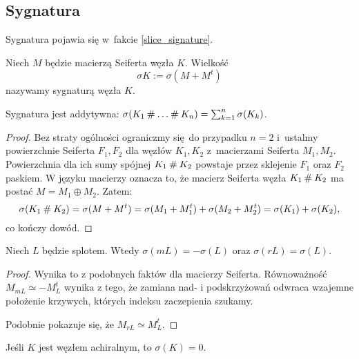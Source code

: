 \subsection{Sygnatura} %
\label{sub:signature}
Sygnatura pojawia się w~fakcie \ref{slice_signature}.

\begin{definition}
    Niech $M$ będzie macierzą Seiferta węzła $K$.
    Wielkość
    \begin{equation}
        \sigma K := \sigma(M + M^t)
    \end{equation}
    nazywamy sygnaturą węzła $K$.
\end{definition}

\begin{proposition} \label{prop_sigma_additive}
    Sygnatura jest addytywna: $\sigma(K_1 \mathbin{\#} \ldots \mathbin{\#} K_n) = \sum_{k=1}^n \sigma(K_k)$.
\end{proposition}

\begin{proof}
    Bez straty ogólności ograniczmy się do przypadku $n = 2$ i~ustalmy powierzchnie Seiferta $F_1, F_2$ dla węzłów $K_1, K_2$ z~macierzami Seiferta $M_1, M_2$.
    Powierzchnia dla ich sumy spójnej $K_1 \mathbin{\#} K_2$ powstaje przez sklejenie $F_1$ oraz $F_2$ paskiem.
    W języku macierzy oznacza to, że macierz Seiferta węzła $K_1 \mathbin{\#} K_2$ ma postać $M = M_1 \oplus M_2$.
    Zatem:
    \begin{equation}
        \sigma(K_1 \mathbin{\#} K_2) = \sigma(M + M^t) = \sigma(M_1 + M_1^t) + \sigma(M_2 + M_2^t) = \sigma(K_1) + \sigma(K_2),
    \end{equation}
    co kończy dowód.
\end{proof}

\begin{proposition} \label{prop_sigma_inverse}
    Niech $L$ będzie splotem.
    Wtedy $\sigma(mL) = -\sigma(L)$ oraz $\sigma(rL) = \sigma(L)$.
\end{proposition}

\begin{proof}
    Wynika to z podobnych faktów dla macierzy Seiferta.
    Równoważność $M_{mL} \simeq - M_L^t$ wynika z tego, że zamiana nad- i podskrzyżowań odwraca wzajemne położenie krzywych, których indeksu zaczepienia szukamy.

    Podobnie pokazuje się, że $M_{rL} \simeq M_L^t$.
\end{proof}

\begin{corollary}
    \label{crl:acheiral_signature}
    Jeśli $K$ jest węzłem achiralnym, to $\sigma(K) = 0$.
\end{corollary}

